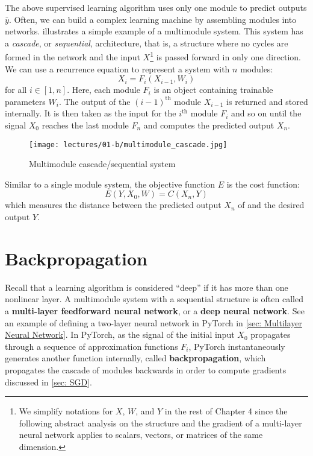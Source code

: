The above supervised learning algorithm uses only one module to predict outputs $\bar{y}$.
Often, we can build a complex learning machine by assembling modules into networks.
 illustrates a simple example of a multimodule system.
This system has a \textit{cascade}, or \textit{sequential}, architecture, that is, a structure where no cycles are formed in the network and the input $X$\footnote{We simplify notations for $X$, $W$, and $Y$ in the rest of Chapter 4 since the following abstract analysis on the structure and the gradient of a multi-layer neural network applies to scalars, vectors, or matrices of the same dimension.} is passed forward in only one direction.
We can use a recurrence equation to represent a system with $n$ modules:
\[
X_i = F_i(X_{i-1}, W_i)
\]
for all $i \in [1, n]$.
Here, each module $F_i$ is an object containing trainable parameters $W_i$.
The output of the $(i-1)^\text{th}$ module $X_{i-1}$ is returned and stored internally.
It is then taken as the input for the $i^\text{th}$ module $F_i$ and so on until the signal $X_0$ reaches the last module $F_n$ and computes the predicted output $X_n$.

\begin{figure}[ht]
\centering
\texttt{[image: lectures/01-b/multimodule\_cascade.jpg]}
\caption{Multimodule cascade/sequential system}
\label{fig: multimodule_cascade}
\end{figure}

Similar to a single module system, the objective function $E$ is the cost function:
\[
E(Y, X_0, W) = C(X_n, Y)
\]
which measures the distance between the predicted output $X_n$ of and the desired output $Y$.
\section{Backpropagation}\label{sec: Backpropagation}

Recall that a learning algorithm is considered ``deep'' if it has more than one nonlinear layer.
A multimodule system with a sequential structure is often called a \textbf{multi-layer feedforward neural network}, or a \textbf{deep neural network}.
See an example of defining a two-layer neural network in PyTorch in \cref{sec: Multilayer Neural Network}.
In PyTorch, as the signal of the initial input $X_0$ propagates through a sequence of approximation functions $F_i$, PyTorch instantaneously generates another function internally, called \textbf{backpropagation}, which propagates the cascade of modules backwards in order to compute gradients discussed in \cref{sec: SGD}.

